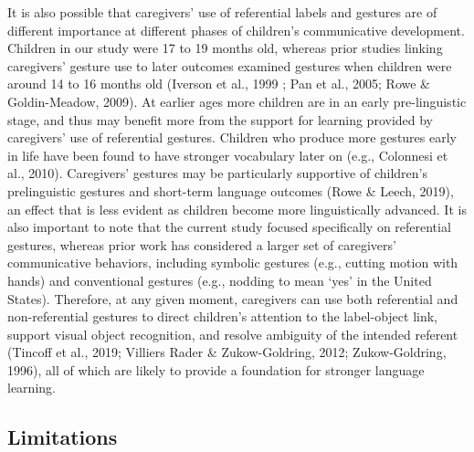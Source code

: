 \documentclass[
  man,floatsintext]{apa6}
\begin{document}
It is also possible that caregivers' use of referential labels and gestures are of different importance at different phases of children's communicative development. Children in our study were 17 to 19 months old, whereas prior studies linking caregivers' gesture use to later outcomes examined gestures when children were around 14 to 16 months old (Iverson et al., 1999 ; Pan et al., 2005; Rowe \& Goldin-Meadow, 2009). At earlier ages more children are in an early pre-linguistic stage, and thus may benefit more from the support for learning provided by caregivers' use of referential gestures. Children who produce more gestures early in life have been found to have stronger vocabulary later on (e.g., Colonnesi et al., 2010). Caregivers' gestures may be particularly supportive of children's prelinguistic gestures and short-term language outcomes (Rowe \& Leech, 2019), an effect that is less evident as children become more linguistically advanced. It is also important to note that the current study focused specifically on referential gestures, whereas prior work has considered a larger set of caregivers' communicative behaviors, including symbolic gestures (e.g., cutting motion with hands) and conventional gestures (e.g., nodding to mean `yes' in the United States). Therefore, at any given moment, caregivers can use both referential and non-referential gestures to direct children's attention to the label-object link, support visual object recognition, and resolve ambiguity of the intended referent (Tincoff et al., 2019; Villiers Rader \& Zukow-Goldring, 2012; Zukow-Goldring, 1996), all of which are likely to provide a foundation for stronger language learning.

\hypertarget{limitations}{%
\subsection{Limitations}\label{limitations}}
\end{document}
